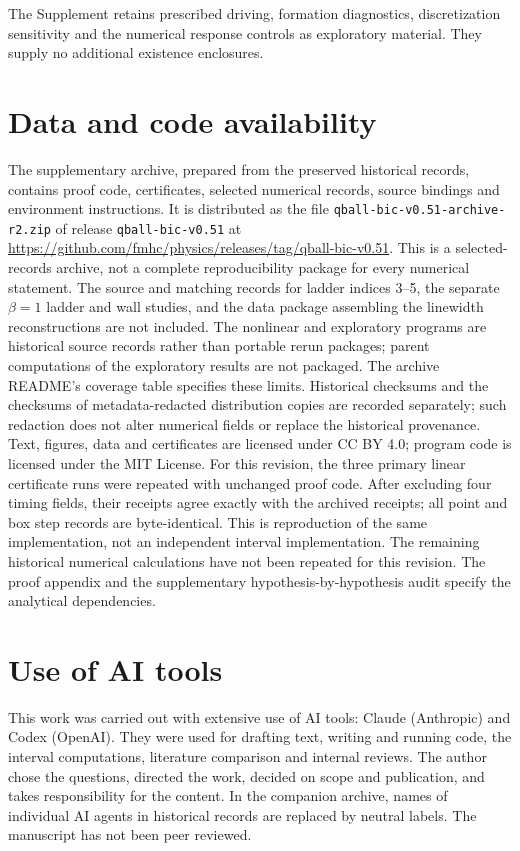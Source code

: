 \documentclass[a4paper,11pt]{article}
\begin{document}
The Supplement retains prescribed driving, formation diagnostics,
discretization sensitivity and the numerical response controls as
exploratory material. They supply no additional existence enclosures.
\section*{Data and code availability}
The supplementary archive, prepared from the preserved historical
records, contains proof code, certificates, selected numerical records,
source bindings and environment instructions. It is distributed as the
file \texttt{qball-bic-v0.51-archive-r2.zip} of release
\texttt{qball-bic-v0.51} at
\url{https://github.com/fmhc/physics/releases/tag/qball-bic-v0.51}.
This is a selected-records archive, not a complete reproducibility
package for every numerical statement. The source and matching records
for ladder indices 3--5, the separate $\beta=1$ ladder and wall studies,
and the data package assembling the linewidth reconstructions are not
included. The nonlinear and exploratory programs are historical source
records rather than portable rerun packages; parent computations of the
exploratory results are not packaged. The archive README's coverage
table specifies these limits.
Historical checksums and the checksums of metadata-redacted distribution
copies are recorded separately; such redaction does not alter numerical
fields or replace the historical provenance.
Text, figures, data and certificates are licensed under CC BY 4.0;
program code is licensed under the MIT License. For this revision, the three primary linear
certificate runs were repeated with unchanged proof code. After excluding
four timing fields, their receipts agree exactly with the archived
receipts; all point and box step records are byte-identical. This is
reproduction of the same implementation, not an independent interval
implementation. The remaining historical numerical calculations have not
been repeated for this revision. The proof appendix and the
supplementary hypothesis-by-hypothesis audit specify the analytical dependencies.

\section*{Use of AI tools}
This work was carried out with extensive use of AI tools: Claude
(Anthropic) and Codex (OpenAI). They were used for drafting text,
writing and running code, the interval computations, literature
comparison and internal reviews. The author chose the questions,
directed the work, decided on scope and publication, and takes
responsibility for the content. In the companion archive, names of
individual AI agents in historical records are replaced by neutral
labels. The manuscript has not been peer reviewed.
\appendix


\end{document}
